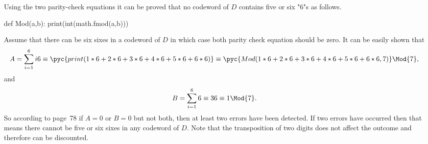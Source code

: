 Using the two parity-check equations it can be proved that no codeword of $D$ contains five or six "6"s as follows.
\begin{comment}
\begin{align*}
	\sum_{i=1,i\neq j}^6i6 +j6 &\equiv B \Mod{7},\\
	\sum_{i=1,i\neq j}^6i6 +j6 - j6 + jx_j &\equiv B - j6 + jx_j\Mod{7},\\
	\sum_{i=1,i\neq j}^6i6 +j6 &\equiv B \equiv 0 \Mod{7}.
\end{align*}
Now, for $j \in \{1,2,\ldots,6\}$ and $x_j \in \{0,1,\ldots.6\}$ we have $-j6 + jx_j\equiv 0 \Mod{7}$ if and only if $x_j\equiv 6 \Mod{7}$.

\begin{align*}
	\sum_{i=1}^6 6 -6 + x_j &\equiv A - 6 + x_j \Mod{7},\\
	 &\equiv 1 - 6 + x_j \Mod{7},\\
	  &\equiv -5 + x_j \Mod{7}.
\end{align*}
Now, for $j \in \{1,2,\ldots,6\}$ and $x_j \in GF(6)$ we have $-5 + x_j\equiv 0 \Mod{7}$ if and only if $x_j \equiv 5 \Mod{7}$.

According to \hill page~78 case~(3) for the case where $A=0$ or $B=0$ but not both, then at least two errors have been detected in the codeword. In view of this a valid codeword of $D$ cannot contain five or six "6"s.
\end{comment}
\begin{pycode}
def Mod(a,b):
	print(int(math.fmod(a,b)))

\end{pycode}
Assume that there can be six sixes in a codeword of $D$ in which case both parity check equation should be zero. It can be easily shown that
\begin{equation}
\label{eq:4.10}
	A = \sum_{i=1}^6 i6\equiv \pyc{print(1*6+2*6+3*6+4*6+5*6+6*6)} \equiv \pyc{Mod(1*6+2*6+3*6+4*6+5*6+6*6,7)}\Mod{7},
\end{equation}
and
\begin{equation}
\label{eq:4.10}
	B = \sum_{i=1}^6 6 \equiv 36 \equiv 1 \Mod{7}.
\end{equation}
So according to \hill page~78 if $A=0$ or $B=0$ but not both, then at least two errors have been detected.  If two errors have occurred then that means there cannot be five or six sixes in any codeword of $D$. Note that the transposition of two digits does not affect the outcome and therefore can be discounted.